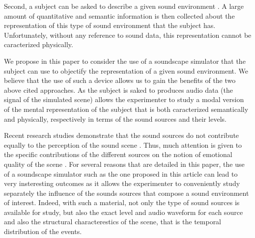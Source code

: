\documentclass[twoside,twocolumn]{article}
\begin{document}
Second, a subject can be asked to describe a given sound environment \cite{guastavino2006ideal, dubois2006cognitive}. A large amount of quantitative and semantic information is then collected about the representation of this type of sound environment that the subject has. Unfortunately, without any reference to sound data, this representation cannot be caracterized physically.


We propose in this paper to consider the use of a soundscape simulator that the subject can use to objectify the representation of a given sound environment. We believe that the use of such a device allows us to gain the benefits of the two above cited approaches. As the subject is saked to produces audio data (the signal of the simulated scene) allows the experimenter to study a modal version of the mental representation of the subject that is both caracterized semantically and physically, respectively in terms of the sound sources and their levels.


Recent research studies demonstrate that the sound sources do not contribute equally to the perception of the sound scene \cite{defreville2004aactivity,lavandier2006contribution,guastavino2006ideal,nilsson2007soundscape,
szeremeta2009analysis}. Thus, much attention is given to the specific contributions of the different sources on the notion of emotional quality of the scene \cite{gozalo2015relationship,ricciardi2015sound}. For several reasons that are detailed in this paper, the use of a soundscape simulator such as the one proposed in this article can lead to very insteresting outcomes as it allows the experimenter to conveniently study separately the influence of the sounds sources that compose a sound environment of interest. Indeed, with such a material, not only the type of sound sources is available for study, but also the exact level and audio waveform for each source and also the structural characterestics of the scene, that is the temporal distribution of the events.
\end{document}
